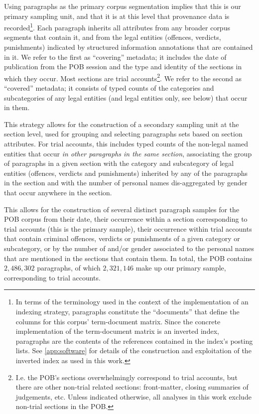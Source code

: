 Using paragraphs as the primary corpus segmentation implies that this is our primary sampling unit, and that it is at this level that provenance data is recorded\footnote{
    \label{foot:indexdocs}
    In terms of the terminology used in the context of the implementation of an indexing strategy, paragraphs constitute the ``documents'' that define the columns for this corpus' term-document matrix.
    Since the concrete implementation of the term-document matrix is an inverted index, paragraphs are the contents of the references contained in the index's posting lists.
    See \autoref{app:software} for details of the construction and exploitation of the inverted index as used in this work.
}.
Each paragraph inherits all attributes from any broader corpus segments that contain it, and from the legal entities (offences, verdicts, punishments) indicated by structured information annotations that are contained in it.
We refer to the first as ``covering'' metadata; it includes the date of publication from the POB session and the type and identity of the sections in which they occur. Most sections are trial accounts\footnote{
    \label{foot:pobsections}
    I.e. the POB's sections overwhelmingly correspond to trial accounts, but there are other non-trial related sections: front-matter, closing summaries of judgements, etc.
    Unless indicated otherwise, all analyses in this work exclude non-trial sections in the POB.
}.
We refer to the second as ``covered'' metadata; it consists of typed counts of the categories and subcategories of any legal entities (and legal entities only, see below) that occur in them.

This strategy allows for the construction of a secondary sampling unit at the section level, used for grouping and selecting paragraphs sets based on section attributes.
For trial accounts, this includes typed counts of the non-legal named entities that occur \emph{in other paragraphs in the same section}, associating the group of paragraphs in a given section with the category and subcategory of legal entities (offences, verdicts and punishments) inherited by any of the paragraphs in the section and with the number of personal names dis-aggregated by gender that occur anywhere in the section.

This allows for the construction of several distinct paragraph samples for the POB corpus from their date, their occurrence within a section corresponding to trial accounts (this is the primary sample), their occurrence within trial accounts that contain criminal offences, verdicts or punishments of a given category or subcategory, or by the number of and/or gender associated to the personal names that are mentioned in the sections that contain them.
In total, the POB contains $2,486,302$ paragraphs, of which $2,321,146$ make up our primary sample, corresponding to trial accounts.

